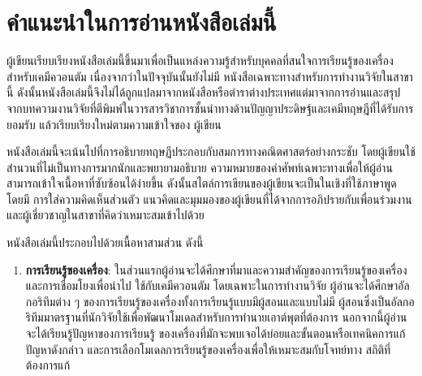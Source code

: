 

{

\chapter*{\centering คำแนะนำในการอ่านหนังสือเล่มนี้}

ผู้เขียนเรียบเรียงหนังสือเล่มนี้ขึ้นมาเพื่อเป็นแหล่งความรู้สำหรับบุคคลที่สนใจการเรียนรู้ของเครื่องสำหรับเคมีควอนตัม เนื่องจากว่าในปัจจุบันนั้นยังไม่มี%
หนังสือเฉพาะทางสำหรับการทำงานวิจัยในสาขานี้ ดังนั้นหนังสือเล่มนี้จึงไม่ได้ถูกแปลมาจากหนังสือหรือตำราต่างประเทศแต่มาจากการอ่านและสรุป%
จากบทความงานวิจัยที่ตีพิมพ์ในวารสารวิชาการชั้นนำทางด้านปัญญาประดิษฐ์และเคมีทฤษฎีที่ได้รับการยอมรับ แล้วเรียบเรียงใหม่ตามความเข้าใจของ%
ผู้เขียน

หนังสือเล่มนี้จะเน้นไปที่การอธิบายทฤษฏีประกอบกับสมการทางคณิตศาสตร์อย่างกระชับ โดยผู้เขียนใช้สำนวนที่ไม่เป็นทางการมากนักและพยายามอธิบาย%
ความหมายของคำศัพท์เฉพาะทางเพื่อให้ผู้อ่านสามารถเข้าใจเนื้อหาที่ซับซ้อนได้ง่ายขึ้น ดังนั้นสไตล์การเขียนของผู้เขียนจะเป็นในเชิงที่ใช้ภาษาพูด โดยมี%
การใส่ความคิดเห็นส่วนตัว แนวคิดและมุมมองของผู้เขียนที่ได้จากการอภิปรายกับเพื่อนร่วมงานและผู้เชี่ยวชาญในสาขาที่คิดว่าเหมาะสมเข้าไปด้วย

หนังสือเล่มนี้ประกอบไปด้วยเนื้อหาสามส่วน ดังนี้ 

\begin{enumerate}
    \item \textbf{การเรียนรู้ของเครื่อง}: ในส่วนแรกผู้อ่านจะได้ศึกษาที่มาและความสำคัญของการเรียนรู้ของเครื่องและการเชื่อมโยงเพื่อนำไป%
    ใช้กับเคมีควอนตัม โดยเฉพาะในการทำงานวิจัย ผู้อ่านจะได้ศึกษาอัลกอริทึมต่าง ๆ ของการเรียนรู้ของเครื่องทั้งการเรียนรู้แบบมีผู้สอนและแบบไม่มี%
    ผู้สอนซึ่งเป็นอัลกอริทึมมาตรฐานที่นักวิจัยใช้เพื่อพัฒนาโมเดลสำหรับการทำนายเอาต์พุตที่ต้องการ นอกจากนี้ผู้อ่านจะได้เรียนรู้ปัญหาของการเรียนรู้%
    ของเครื่องที่มักจะพบเจอได้บ่อยและขั้นตอนหรือเทคนิคการแก้ปัญหาดังกล่าว และการเลือกโมเดลการเรียนรู้ของเครื่องเพื่อให้เหมาะสมกับโจทย์ทาง%
    สถิติที่ต้องการแก้
    

\end{enumerate}}
